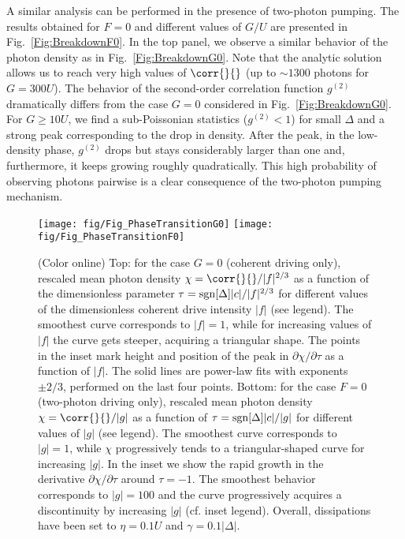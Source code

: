 A similar analysis can be performed in the presence of two-photon pumping.
The results obtained for $F=0$ and different values of $G/U$ are presented in Fig.~\ref{Fig:BreakdownF0}.
In the top panel, we observe a similar behavior of the photon density as in Fig.~\ref{Fig:BreakdownG0}.
Note that the analytic solution allows us to reach very high values of $\corr{}{}$ (up to $\sim1300$ photons for $G=300U$).
The behavior of the second-order correlation function $g^{(2)}$ dramatically differs from the case $G=0$ considered in Fig.~\ref{Fig:BreakdownG0}.
For $G\geqslant10U$, we find a sub-Poissonian statistics ($g^{(2)}<1$) for small $\Delta$ and a strong peak corresponding to the drop in density.
After the peak, in the low-density phase, $g^{(2)}$ drops but stays considerably larger than one and, furthermore, it keeps growing roughly quadratically.
This high probability of observing photons pairwise is a clear consequence of the two-photon pumping mechanism.

\begin{figure}[t!]
	\texttt{[image: fig/Fig\_PhaseTransitionG0]}\vspace{0.5cm}
	\texttt{[image: fig/Fig\_PhaseTransitionF0]}
	\caption{(Color online)
		Top: for the case $G=0$ (coherent driving only), rescaled mean photon density $\chi=\corr{}{}/|f|^{2/3}$ as a function of the dimensionless parameter $\tau={\rm sgn}[\Delta]|c|/|f|^{2/3}$ for different values of the dimensionless coherent drive intensity $|f|$ (see legend).
		The smoothest curve corresponds to $|f|=1$, while for increasing values of $|f|$ the curve gets steeper, acquiring a triangular shape.
		The points in the inset mark height and position of the peak in $\partial\chi/\partial\tau$ as a function of $|f|$.
		The solid lines are power-law fits with exponents $\pm2/3$, performed on the last four points.
		Bottom: for the case $F=0$ (two-photon driving only), rescaled mean photon density $\chi=\corr{}{}/|g|$ as a function of $\tau={\rm sgn}[\Delta]|c|/|g|$ for different values of $|g|$ (see legend).
		The smoothest curve corresponds to $|g|=1$, while $\chi$ progressively tends to a triangular-shaped curve for increasing $|g|$.
		In the inset we show the rapid growth in the derivative $\partial\chi/\partial\tau$ around $\tau=-1$. The smoothest behavior corresponds to $|g|=100$ and the curve progressively acquires a discontinuity by increasing $|g|$ (cf. inset legend).
		Overall, dissipations have been set to $\eta=0.1U$ and $\gamma=0.1|\Delta|$.}
	\label{Fig:PhaseTransition}
\end{figure}

